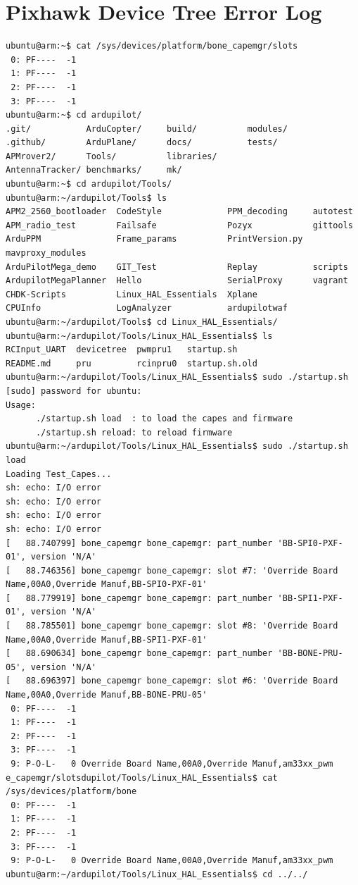 \documentclass[IEEEtran,letterpaper,10pt,notitlepage,draftclsnofoot,onecolumn]{article}
\begin{document}
\section{Pixhawk Device Tree Error Log}
\begin{verbatim}
ubuntu@arm:~$ cat /sys/devices/platform/bone_capemgr/slots
 0: PF----  -1
 1: PF----  -1
 2: PF----  -1
 3: PF----  -1
ubuntu@arm:~$ cd ardupilot/
.git/           ArduCopter/     build/          modules/
.github/        ArduPlane/      docs/           tests/
APMrover2/      Tools/          libraries/
AntennaTracker/ benchmarks/     mk/
ubuntu@arm:~$ cd ardupilot/Tools/
ubuntu@arm:~/ardupilot/Tools$ ls
APM2_2560_bootloader  CodeStyle             PPM_decoding     autotest
APM_radio_test        Failsafe              Pozyx            gittools
ArduPPM               Frame_params          PrintVersion.py  mavproxy_modules
ArduPilotMega_demo    GIT_Test              Replay           scripts
ArdupilotMegaPlanner  Hello                 SerialProxy      vagrant
CHDK-Scripts          Linux_HAL_Essentials  Xplane
CPUInfo               LogAnalyzer           ardupilotwaf
ubuntu@arm:~/ardupilot/Tools$ cd Linux_HAL_Essentials/
ubuntu@arm:~/ardupilot/Tools/Linux_HAL_Essentials$ ls
RCInput_UART  devicetree  pwmpru1   startup.sh
README.md     pru         rcinpru0  startup.sh.old
ubuntu@arm:~/ardupilot/Tools/Linux_HAL_Essentials$ sudo ./startup.sh
[sudo] password for ubuntu:
Usage:
      ./startup.sh load  : to load the capes and firmware
      ./startup.sh reload: to reload firmware
ubuntu@arm:~/ardupilot/Tools/Linux_HAL_Essentials$ sudo ./startup.sh load
Loading Test_Capes...
sh: echo: I/O error
sh: echo: I/O error
sh: echo: I/O error
sh: echo: I/O error
[   88.740799] bone_capemgr bone_capemgr: part_number 'BB-SPI0-PXF-01', version 'N/A'
[   88.746356] bone_capemgr bone_capemgr: slot #7: 'Override Board Name,00A0,Override Manuf,BB-SPI0-PXF-01'
[   88.779919] bone_capemgr bone_capemgr: part_number 'BB-SPI1-PXF-01', version 'N/A'
[   88.785501] bone_capemgr bone_capemgr: slot #8: 'Override Board Name,00A0,Override Manuf,BB-SPI1-PXF-01'
[   88.690634] bone_capemgr bone_capemgr: part_number 'BB-BONE-PRU-05', version 'N/A'
[   88.696397] bone_capemgr bone_capemgr: slot #6: 'Override Board Name,00A0,Override Manuf,BB-BONE-PRU-05'
 0: PF----  -1
 1: PF----  -1
 2: PF----  -1
 3: PF----  -1
 9: P-O-L-   0 Override Board Name,00A0,Override Manuf,am33xx_pwm
e_capemgr/slotsdupilot/Tools/Linux_HAL_Essentials$ cat /sys/devices/platform/bone
 0: PF----  -1
 1: PF----  -1
 2: PF----  -1
 3: PF----  -1
 9: P-O-L-   0 Override Board Name,00A0,Override Manuf,am33xx_pwm
ubuntu@arm:~/ardupilot/Tools/Linux_HAL_Essentials$ cd ../../
\end{verbatim}
\end{document}
